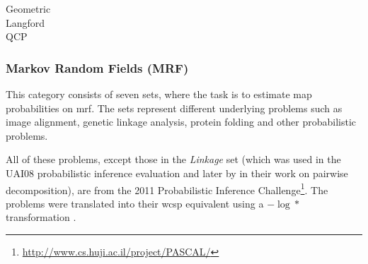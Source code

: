 \begin{description}
		\parencite{Lecoutre04}
	\item[Geometric]
	\item[Langford]
	\item[QCP]
		\parencite{Gomes02}
\end{description}

\subsubsection{Markov Random Fields (MRF)}
This category consists of seven sets, where the task is to estimate \gls{map} probabilities on \gls{mrf}. The sets represent different underlying problems such as image alignment, genetic linkage analysis, protein folding and other probabilistic problems.

All of these problems, except those in the \emph{Linkage} set (which was used in the UAI08 probabilistic inference evaluation and later by \textcite{Favier11} in their work on pairwise decomposition), are from the 2011 Probabilistic Inference Challenge\footnote{\url{http://www.cs.huji.ac.il/project/PASCAL/}}.
The problems were translated into their \gls{wcsp} equivalent using a \(-\log*{}\) transformation \parencite[\pno~4]{deGivry14}.

